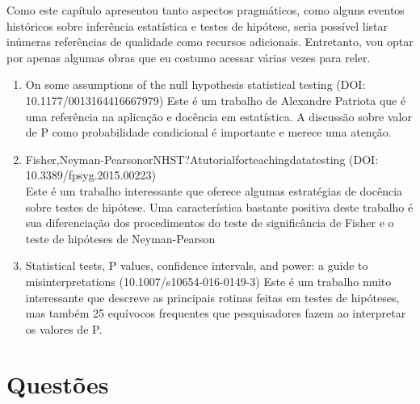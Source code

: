 \documentclass[
]{book}
\begin{document}
Como este capítulo apresentou tanto aspectos pragmáticos, como alguns eventos históricos sobre inferência estatística e testes de hipótese, seria possível listar inúmeras referências de qualidade como recursos adicionais. Entretanto, vou optar por apenas algumas obras que eu costumo acessar várias vezes para reler.

\begin{enumerate}
\def\labelenumi{\arabic{enumi}.}
\item
  On some assumptions of the null hypothesis statistical testing (DOI: 10.1177/0013164416667979)
  Este é um trabalho de Alexandre Patriota que é uma referência na aplicação e docência em estatística. A discussão sobre valor de P como probabilidade condicional é importante e merece uma atenção.
\item
  Fisher,Neyman-PearsonorNHST?Atutorialforteachingdatatesting (DOI: 10.3389/fpsyg.2015.00223)\\
  Este é um trabalho interessante que oferece algumas estratégias de docência sobre testes de hipótese. Uma característica bastante positiva deste trabalho é sua diferenciação dos procedimentos do teste de significância de Fisher e o teste de hipóteses de Neyman-Pearson
\item
  Statistical tests, P values, confidence intervals, and power: a guide to misinterpretations (10.1007/s10654-016-0149-3)
  Este é um trabalho muito interessante que descreve as principais rotinas feitas em testes de hipóteses, mas também 25 equívocos frequentes que pesquisadores fazem ao interpretar os valores de P.
\end{enumerate}

\hypertarget{questuxf5es-2}{%
\section{Questões}\label{questuxf5es-2}}
\end{document}
